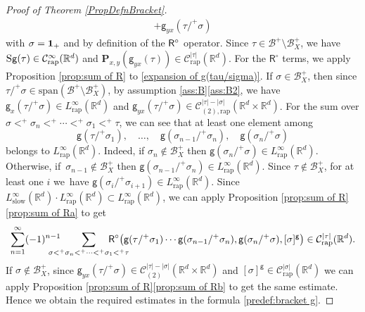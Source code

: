 \documentclass[10pt]{amsart}
\theoremstyle{plain}
\theoremstyle{definition}
\newcommand{\rap}{\mathrm{rap}}
\newcommand{\slow}{\mathrm{slow}}
\newcommand{\bfP}{\mathbf{P}}
\newcommand{\sfR}{\mathsf{R}}
\newcommand{\sfg}{\mathsf{g}}
\newcommand{\bbR}{\mathbb{R}}
\newcommand{\mcB}{\mathcal{B}}
\newcommand{\mcC}{\mathcal{C}}
\begin{document}
\begin{proof}[Proof of Theorem \ref{PropDefnBracket}]
\begin{multline}
+\sfg_{yx}(\tau/^+\sigma)
\end{multline}
with $\sigma={\bf1}_+$ and by definition of the ${\sf R}^\circ$ operator. Since $\tau\in\mcB^+\setminus\mcB_X^+$, we have $\textsc{S}\sfg(\tau)\in \mcC_\rap^\infty(\bbR^d)$ and $\bfP_{x,y}(\sfg_{yx}(\tau))\in \mcC_\rap^{|\tau|}(\bbR^d)$. For the ${\sfR}^\circ$ terms, we apply Proposition \ref{prop:sum of R} to \eqref{expansion of g(tau/sigma)}. If $\sigma\in\mcB_X^+$, then since $\tau/^+\sigma\in\textrm{span}(\mcB^+\setminus\mcB_X^+)$, by assumption \ref{ass:B}\eqref{ass:B2}, we have $\sfg_x(\tau/^+\sigma)\in L_{\rap}^\infty(\bbR^d)$ and $\sfg_{yx}(\tau/^+\sigma)\in\mcC_{(2),\rap}^{|\tau|-|\sigma|}(\bbR^d\times\bbR^d)$. For the sum over $\sigma<^+\sigma_n<^+\cdots<^+\sigma_1<^+\tau$, we can see that at least one element among
\[
\sfg(\tau/^+\sigma_1),\quad \dots,\quad\sfg(\sigma_{n-1}/^+\sigma_n),\quad\sfg(\sigma_n/^+\sigma)
\]
belongs to $L_\rap^\infty(\bbR^d)$. Indeed, if $\sigma_n\notin\mcB_X^+$ then $\sfg(\sigma_n/^+\sigma)\in L_\rap^\infty(\bbR^d)$. Otherwise, if~$\sigma_{n-1}\notin\mcB_X^+$ then $\sfg(\sigma_{n-1}/^+\sigma_n)\in L_\rap^\infty(\bbR^d)$. Since $\tau\notin\mcB_X^+$, for at least one $i$ we~have $\sfg(\sigma_i/^+\sigma_{i+1})\in L_\rap^\infty(\bbR^d)$. Since $L_\slow^\infty(\bbR^d)\cdot L_\rap^\infty(\bbR^d)\subset L_\rap^\infty(\bbR^d)$, we can apply Proposition \ref{prop:sum of R}\eqref{prop:sum of Ra} to get
\[
\sum_{n=1}^\infty(-1)^{n-1}\hspace*{-5mm}\sum_{\sigma<^+\sigma_n<^+\cdots<^+\sigma_1<^+\tau}\hspace*{-8mm} \sfR^\circ\bigl(\sfg(\tau/^+\sigma_1)\cdots\sfg(\sigma_{n-1}/^+\sigma_n),\sfg(\sigma_n/^+\sigma),[\sigma]^\sfg\bigr)\in \mcC_\rap^{|\tau|}(\bbR^d).
\]
If $\sigma\notin\mcB_X^+$, since $\sfg_{yx}(\tau/^+\sigma)\in\mcC_{(2)}^{|\tau|-|\sigma|}(\bbR^d\times\bbR^d)$ and $[\sigma]^\sfg\in \mcC_\rap^{|\sigma|}(\bbR^d)$ we can apply Proposition \ref{prop:sum of R}\eqref{prop:sum of Rb} to get the same estimate. Hence we obtain the required estimates in the formula \eqref{predef:bracket g}.


\end{proof}
\end{document}
